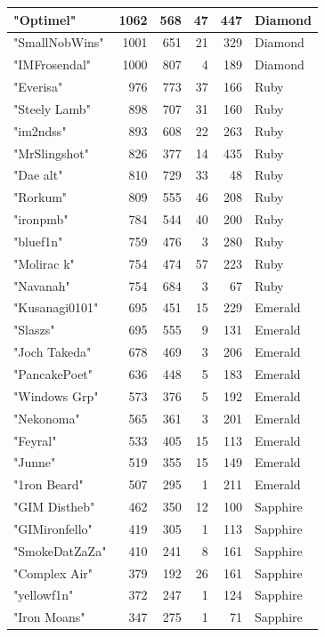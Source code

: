 \documentclass{article}
\begin{document}
\begin{table}[htbp]
\begin{tabular}{|l|r|r|r|r|l|}
"Optimel" & 1062 & 568 & 47 & 447 & Diamond \\ \hline
"SmallNobWins" & 1001 & 651 & 21 & 329 & Diamond \\ \hline
"IMFrosendal" & 1000 & 807 & 4 & 189 & Diamond \\ \hline
"Everisa" & 976 & 773 & 37 & 166 & Ruby \\ \hline
"Steely Lamb" & 898 & 707 & 31 & 160 & Ruby \\ \hline
"im2ndss" & 893 & 608 & 22 & 263 & Ruby \\ \hline
"MrSlingshot" & 826 & 377 & 14 & 435 & Ruby \\ \hline
"Dae alt" & 810 & 729 & 33 & 48 & Ruby \\ \hline
"Rorkum" & 809 & 555 & 46 & 208 & Ruby \\ \hline
"ironpmb" & 784 & 544 & 40 & 200 & Ruby \\ \hline
"bluef1n" & 759 & 476 & 3 & 280 & Ruby \\ \hline
"Molirac k" & 754 & 474 & 57 & 223 & Ruby \\ \hline
"Navanah" & 754 & 684 & 3 & 67 & Ruby \\ \hline
"Kusanagi0101" & 695 & 451 & 15 & 229 & Emerald \\ \hline
"Slaszs" & 695 & 555 & 9 & 131 & Emerald \\ \hline
"Joch Takeda" & 678 & 469 & 3 & 206 & Emerald \\ \hline
"PancakePoet" & 636 & 448 & 5 & 183 & Emerald \\ \hline
"Windows Grp" & 573 & 376 & 5 & 192 & Emerald \\ \hline
"Nekonoma" & 565 & 361 & 3 & 201 & Emerald \\ \hline
"Feyral" & 533 & 405 & 15 & 113 & Emerald \\ \hline
"Junne" & 519 & 355 & 15 & 149 & Emerald \\ \hline
"1ron Beard" & 507 & 295 & 1 & 211 & Emerald \\ \hline
"GIM Distheb" & 462 & 350 & 12 & 100 & Sapphire \\ \hline
"GIMironfello" & 419 & 305 & 1 & 113 & Sapphire \\ \hline
"SmokeDatZaZa" & 410 & 241 & 8 & 161 & Sapphire \\ \hline
"Complex Air" & 379 & 192 & 26 & 161 & Sapphire \\ \hline
"yellowf1n" & 372 & 247 & 1 & 124 & Sapphire \\ \hline
"Iron Moans" & 347 & 275 & 1 & 71 & Sapphire \\ \hline

\end{tabular}
\end{table}
\end{document}
